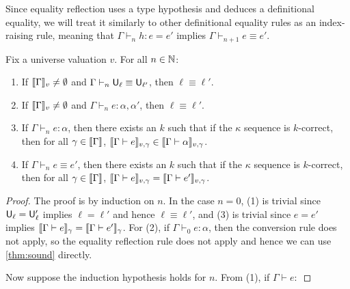 Since equality reflection uses a type hypothesis and deduces a definitional equality, we will treat it similarly to other definitional equality rules as an index-raising rule, meaning that $\Gamma\vdash_n h:e=e'$ implies $\Gamma\vdash_{n+1} e\equiv e'$.

\begin{theorem}
Fix a universe valuation $v$. For all $n\in\mathbb{N}$:
\begin{enumerate}
\item If $\scott{\Gamma}_v\ne\emptyset$ and $\Gamma\vdash_n\U_\ell\equiv\U_{\ell'}$, then $\ell\equiv\ell'$.
\item If $\scott{\Gamma}_v\ne\emptyset$ and $\Gamma\vdash_n e:\alpha,\alpha'$, then $\ell\equiv\ell'$.
\item If $\Gamma\vdash_n e:\alpha$, then there exists an $k$ such that if the $\kappa$ sequence is $k$-correct, then for all $\gamma\in\scott{\Gamma}$, $\scott{\Gamma\vdash e}_{v,\gamma}\in \scott{\Gamma\vdash \alpha}_{v,\gamma}$.
\item If $\Gamma\vdash_n e\equiv e'$, then there exists an $k$ such that if the $\kappa$ sequence is $k$-correct, then for all $\gamma\in\scott{\Gamma}$, $\scott{\Gamma\vdash e}_{v,\gamma}=\scott{\Gamma\vdash e'}_{v,\gamma}$.
\end{enumerate}
\end{theorem}
\begin{proof}
The proof is by induction on $n$. In the case $n=0$, (1) is trivial since $\mathsf{U}_\ell=\mathsf{U}_\ell'$ implies $\ell=\ell'$ and hence $\ell\equiv\ell'$, and (3) is trivial since $e=e'$ implies $\scott{\Gamma\vdash e}_{\gamma}=\scott{\Gamma\vdash e'}_{\gamma}$. For (2), if $\Gamma\vdash_0 e:\alpha$, then the conversion rule does not apply, so the equality reflection rule does not apply and hence we can use \autoref{thm:sound} directly.

Now suppose the induction hypothesis holds for $n$. From (1), if $\Gamma\vdash e:$
\end{proof}